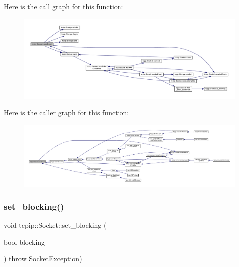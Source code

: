 Here is the call graph for this function\+:
\nopagebreak
\begin{figure}[H]
\begin{center}
\leavevmode
\includegraphics[width=350pt]{classtcpip_1_1_socket_a6d00027b40f48d4ae19e3fff2e89f7ab_cgraph}
\end{center}
\end{figure}
Here is the caller graph for this function\+:
\nopagebreak
\begin{figure}[H]
\begin{center}
\leavevmode
\includegraphics[width=350pt]{classtcpip_1_1_socket_a6d00027b40f48d4ae19e3fff2e89f7ab_icgraph}
\end{center}
\end{figure}
\mbox{\label{classtcpip_1_1_socket_ac382abc174bd18e4a61354cd857470c8}} 
\subsubsection{\texorpdfstring{set\+\_\+blocking()}{set\_blocking()}}
{\footnotesize\ttfamily void tcpip\+::\+Socket\+::set\+\_\+blocking (\begin{DoxyParamCaption}\item[{bool}]{blocking }\end{DoxyParamCaption}) throw  \hyperlink{classtcpip_1_1_socket_exception}{Socket\+Exception}) }


